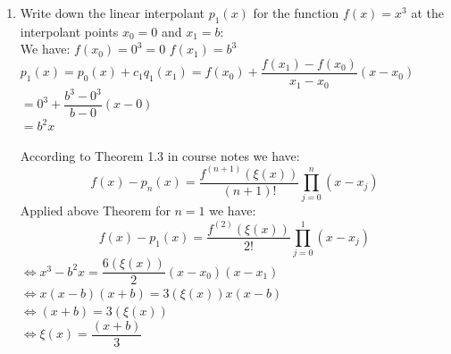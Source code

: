 \documentclass[14pt,a4paper]{article}
\begin{document}
\begin{enumerate}
	\item Write down the linear interpolant $p_1(x)$ for the function $f(x) = x^3$ at the interpolant points $x_0 = 0$ and $x_1 = b$: \\
		We have: \hspace{1cm} $f(x_0) = 0^3 = 0$ \hspace{2cm} $f(x_1) = b^3$\\
		\hspace*{2cm} $p_1(x) = p_0(x) + c_1q_1(x_1)= f(x_0) + \dfrac{f(x_1) - f(x_0)}{x_1 - x_0} (x - x_0) $\\
		\hspace*{6.45cm} $ = 0^3 + \dfrac{b^3 - 0^3}{b - 0}(x-0) $ \\
		\hspace*{6.45cm} $ = b^2x $
	
		According to Theorem 1.3 in course notes we have:
		\hspace*{2cm} $$ f(x) - p_n(x) = \dfrac{f^{(n+1)}(\xi(x))}{(n+1)!}\prod_{j=0}^{n}(x-x_j)$$
		Applied above Theorem for $n =1$ we have:
		\hspace*{1cm} $$ f(x) - p_1(x) = \dfrac{f^{(2)}(\xi(x))}{2!}\prod_{j=0}^{1}(x-x_j)$$
		\hspace*{2cm} $ \Leftrightarrow x^3 - b^2x = \dfrac{6(\xi(x))}{2}(x-x_0)(x-x_1)$ \\
		\hspace*{2cm} $ \Leftrightarrow x(x-b)(x+b) = 3(\xi(x))x(x-b) $\\
		\hspace*{2cm} $ \Leftrightarrow (x+b) = 3(\xi(x))$ \\
		\hspace*{2cm} $ \Leftrightarrow \xi(x) = \dfrac{(x+b)}{3} $ 
		

\end{enumerate}
\end{document}
